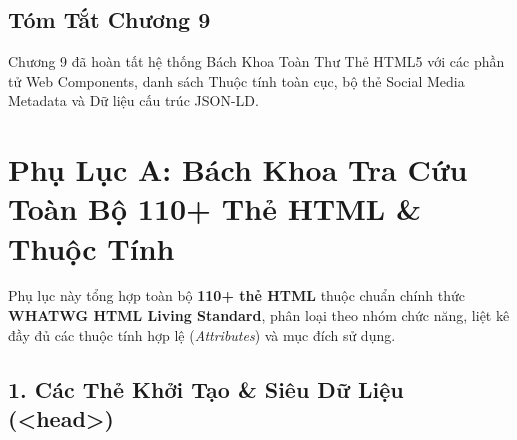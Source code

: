 \documentclass[11pt,oneside]{book}
\begin{document}
\section{Tóm Tắt Chương 9}
Chương 9 đã hoàn tất hệ thống Bách Khoa Toàn Thư Thẻ HTML5 với các phần tử Web Components, danh sách Thuộc tính toàn cục, bộ thẻ Social Media Metadata và Dữ liệu cấu trúc JSON-LD.


\chapter{Phụ Lục A: Bách Khoa Tra Cứu Toàn Bộ 110+ Thẻ HTML \& Thuộc Tính}
\label{chap:appendix_html_tags}

Phụ lục này tổng hợp toàn bộ \textbf{110+ thẻ HTML} thuộc chuẩn chính thức \textbf{WHATWG HTML Living Standard}, phân loại theo nhóm chức năng, liệt kê đầy đủ các thuộc tính hợp lệ (\textit{Attributes}) và mục đích sử dụng.

\section{1. Các Thẻ Khởi Tạo \& Siêu Dữ Liệu (<head>)}
\end{document}
